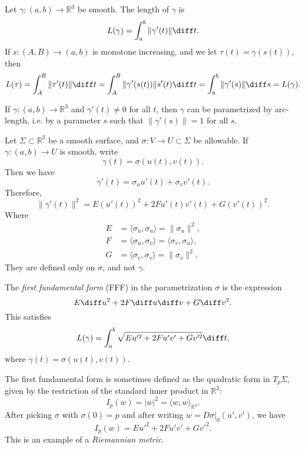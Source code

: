 \documentclass[12pt]{article}
\begin{document}
Let $\gamma : (a, b) \to \mathbb{R}^3$ be smooth. The length of $\gamma$ is
\[
L(\gamma) = \int_{a}^{b} \|\gamma'(t)\| \diff t
.\]
If $s: (A, B) \to (a, b)$ is monotone increasing, and we let $\tau(t) = \gamma(s(t))$, then
\[
L(\tau) = \int_{A}^{B} \|\tau'(t)\| \diff t = \int_{A}^{B} \|\gamma'(s(t)) \| s'(t) \diff t = \int_{a}^{b} \|\gamma'(s)\| \diff s = L(\gamma)
.\]

\begin{lemma}
	If $\gamma : (a, b) \to \mathbb{R}^3$ and $\gamma'(t) \neq 0$ for all $t$, then $\gamma$ can be parametrized by arc-length, i.e. by a parameter $s$ such that $\|\gamma'(s)\| = 1$ for all $s$.
\end{lemma}

Let $\Sigma \subset \mathbb{R}^3$ be a smooth surface, and $\sigma : V \to U \subset \Sigma$ be allowable. If $\gamma : (a, b) \to U$ is smooth, write
\[
\gamma(t) = \sigma(u(t), v(t))
.\]
Then we have
\[
\gamma'(t) = \sigma_u u'(t) + \sigma_v v'(t)
.\]
Therefore,
\[
\|\gamma'(t)\|^2 = E(u'(t))^2 + 2F u'(t) v'(t) + G (v'(t))^2
.\]
Where
\begin{align*}
	E &= \langle \sigma_u, \sigma_u \rangle = \|\sigma_u \|^2, \\
	F &= \langle \sigma_u, \sigma_v \rangle = \langle \sigma_v, \sigma_u \rangle, \\
	G &= \langle \sigma_v, \sigma_v \rangle = \|\sigma_v \|^2.
\end{align*}
They are defined only on $\sigma$, and not $\gamma$.

\begin{definition}
	The \emph{first fundamental form} (FFF) in the parametrization $\sigma$ is the expression
	\[
	E \diff u^2 + 2F \diff u \diff v + G \diff v^2
	.\]
	This satisfies
	\[
		L(\gamma) = \int_{a}^{b} \sqrt{E u'^2 + 2F u'v' + Gv'^2} \diff t
	,\]
	where $\gamma(t) = \sigma(u(t), v(t))$.
\end{definition}

\begin{remark}
	The first fundamental form is sometimes defined as the quadratic form in $T_p \Sigma$, given by the restriction of the standard inner product in $\mathbb{R}^3$:
	\[
	I_p(w) = |w|^2 = \langle w, w \rangle_{\mathbb{R}^3}
	.\]
	After picking $\sigma$ with $\sigma(0) = p$ and after writing $w = D\sigma|_0 (u', v')$, we have
	\[
	I_p(w) = E u'^2 + 2 F u'v' + G v'^2
	.\]
	This is an example of a \emph{Riemannian metric}.
\end{remark}
\end{document}
